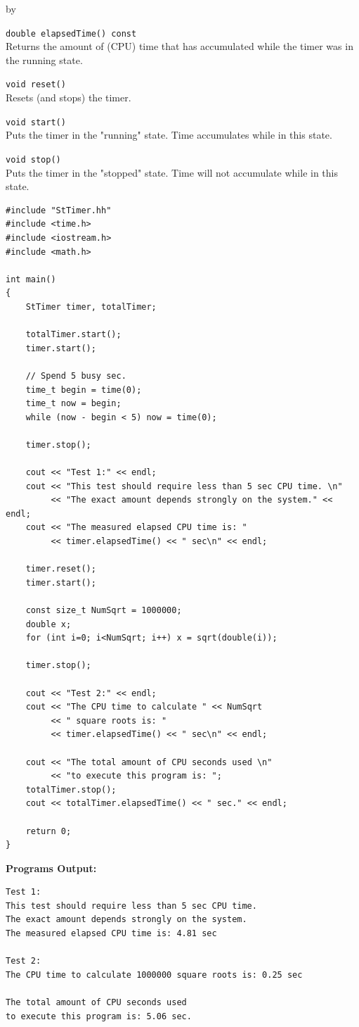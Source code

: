 \documentclass[twoside]{article}
\newcommand{\entrylabel}[1]{\mbox{\textbf{{#1}}}\hfil}%
\newenvironment{entry}
{\begin{list}{}%
    {\renewcommand{\makelabel}{\entrylabel}%
     \setlength{\labelwidth}{90pt}%
     \setlength{\leftmargin}{\labelwidth}
     \advance\leftmargin by \labelsep%
      }%
    }%
  {\end{list}}
\newcommand{\Entrylabel}[1]%
{\raisebox{0pt}[1ex][0pt]{\makebox[\labelwidth][l]%
    {\parbox[t]{\labelwidth}{\hspace{0pt}\textbf{{#1}}}}}}
\newenvironment{Entry}%
{\renewcommand{\entrylabel}{\Entrylabel}\begin{entry}}%
  {\end{entry}}
\begin{document}
\begin{Entry}
    \verb+double elapsedTime() const+\\
    Returns the amount of (CPU) time that has accumulated while
    the timer was in the running state.
 
    \verb+void reset()+\\
    Resets (and stops) the timer.
 
    \verb+void start()+\\
    Puts the timer in the "running" state. Time accumulates while
    in this state.

    \verb+void stop()+\\
    Puts the timer in the "stopped" state. Time will not accumulate
    while in this state.

\item[Example]
{\footnotesize
\begin{verbatim}
#include "StTimer.hh"
#include <time.h>
#include <iostream.h>
#include <math.h>

int main()
{   
    StTimer timer, totalTimer;
    
    totalTimer.start();
    timer.start();
    
    // Spend 5 busy sec.
    time_t begin = time(0);
    time_t now = begin;
    while (now - begin < 5) now = time(0);
    
    timer.stop();
    
    cout << "Test 1:" << endl;
    cout << "This test should require less than 5 sec CPU time. \n"
         << "The exact amount depends strongly on the system." << endl;
    cout << "The measured elapsed CPU time is: "
         << timer.elapsedTime() << " sec\n" << endl;
    
    timer.reset();
    timer.start();
    
    const size_t NumSqrt = 1000000;
    double x;
    for (int i=0; i<NumSqrt; i++) x = sqrt(double(i));
    
    timer.stop();
    
    cout << "Test 2:" << endl;
    cout << "The CPU time to calculate " << NumSqrt
         << " square roots is: "
         << timer.elapsedTime() << " sec\n" << endl;
    
    cout << "The total amount of CPU seconds used \n"
         << "to execute this program is: ";
    totalTimer.stop();
    cout << totalTimer.elapsedTime() << " sec." << endl;
    
    return 0;
}
\end{verbatim}

{\bf Programs Output:}

\begin{verbatim}
Test 1:
This test should require less than 5 sec CPU time. 
The exact amount depends strongly on the system.
The measured elapsed CPU time is: 4.81 sec

Test 2:
The CPU time to calculate 1000000 square roots is: 0.25 sec

The total amount of CPU seconds used 
to execute this program is: 5.06 sec.
\end{verbatim}
}

\end{Entry}
\end{document}
